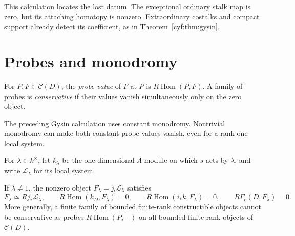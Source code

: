 This calculation locates the lost datum. The exceptional
ordinary stalk map is zero, but its attaching homotopy is
nonzero. Extraordinary costalks and compact support already
detect its coefficient, as in Theorem~\ref{cyf:thm:gysin}.

\section{Probes and monodromy}

\begin{definition}
For \(P,F\in\mathcal C(D)\), the \emph{probe value} of
\(F\) at \(P\) is \(R\operatorname{Hom}(P,F)\).
A family of probes is \emph{conservative} if their values
vanish simultaneously only on the zero object.
\end{definition}

The preceding Gysin calculation uses constant monodromy.
Nontrivial monodromy can make both constant-probe values
vanish, even for a rank-one local system.

For \(\lambda\in k^\times\), let \(k_\lambda\) be the
one-dimensional \(\Lambda\)-module on which \(s\) acts
by \(\lambda\), and write \(\mathcal L_\lambda\) for its
local system.

\begin{proposition}\label{cyp:prop:blindness}
If \(\lambda\ne1\), the nonzero object
\(F_\lambda=j_!\mathcal L_\lambda\) satisfies
\[
 F_\lambda\simeq Rj_*\mathcal L_\lambda,\qquad
 R\operatorname{Hom}(k_D,F_\lambda)=0,
 \qquad R\operatorname{Hom}(i_*k,F_\lambda)=0,
 \qquad R\Gamma_c(D,F_\lambda)=0.
\]
More generally, a finite family of bounded finite-rank
constructible objects cannot be conservative as probes
\(R\operatorname{Hom}(P,-)\) on all bounded finite-rank
objects of \(\mathcal C(D)\).
\end{proposition}

